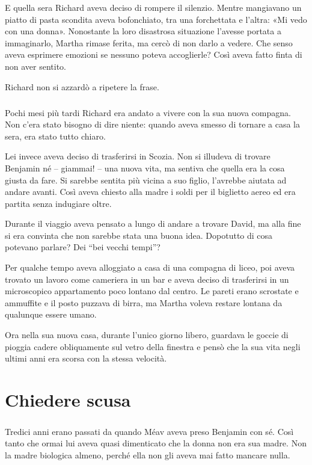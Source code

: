 \documentclass[a4paper,12pt]{book}
\begin{document}
E quella sera Richard aveva deciso di rompere il silenzio. Mentre mangiavano un
piatto di pasta scondita aveva bofonchiato, tra una forchettata e l'altra: «Mi
vedo con una donna». Nonostante la loro disastrosa situazione l'avesse portata
a immaginarlo, Martha rimase ferita, ma cercò di non darlo a vedere. Che senso
aveva esprimere emozioni se nessuno poteva accoglierle? Così aveva fatto finta
di non aver sentito.

Richard non si azzardò a ripetere la frase.

\paragraph{}
Pochi mesi più tardi Richard era andato a vivere con la sua nuova compagna. Non
c'era stato bisogno di dire niente: quando aveva smesso di tornare a casa la
sera, era stato tutto chiaro.

Lei invece aveva deciso di trasferirsi in Scozia. Non si illudeva di trovare
Benjamin né -- giammai! -- una nuova vita, ma sentiva che quella era la cosa
giusta da fare. Si sarebbe sentita più vicina a suo figlio, l'avrebbe aiutata
ad andare avanti. Così aveva chiesto alla madre i soldi per il biglietto aereo
ed era partita senza indugiare oltre.

Durante il viaggio aveva pensato a lungo di andare a trovare David, ma alla fine
si era convinta che non sarebbe stata una buona idea. Dopotutto di cosa potevano
parlare? Dei ``bei vecchi tempi''?

Per qualche tempo aveva alloggiato a casa di una compagna di liceo, poi aveva
trovato un lavoro come cameriera in un bar e aveva deciso di trasferirsi in un
microscopico appartamento poco lontano dal centro. Le pareti erano scrostate e
ammuffite e il posto puzzava di birra, ma Martha voleva restare lontana da
qualunque essere umano.

Ora nella sua nuova casa, durante l'unico giorno libero, guardava le goccie di
pioggia cadere obliquamente sul vetro della finestra e pensò che la sua vita
negli ultimi anni era scorsa con la stessa velocità.

\chapter{Chiedere scusa}

\paragraph{}
Tredici anni erano passati da quando Méav aveva preso Benjamin con sé. Così
tanto che ormai lui aveva quasi dimenticato che la donna non era sua madre. Non
la madre biologica almeno, perché ella non gli aveva mai fatto mancare nulla.
\end{document}
